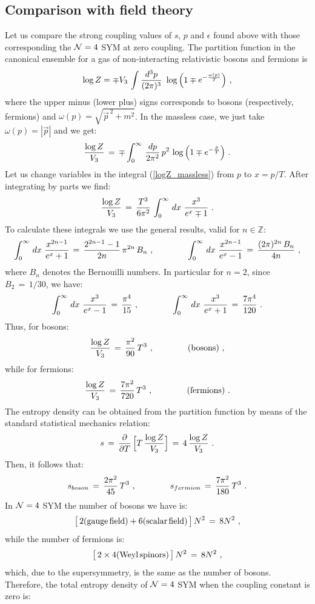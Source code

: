 \documentclass[12pt,notitlepage]{article}
\newcommand{\beq}{\begin{equation}}
\newcommand{\eeq}{\end{equation}}
\begin{document}
\subsection{ Comparison with field theory}
Let us compare the strong coupling values of  $s$, $p$ and $\epsilon$  found above with those corresponding the ${\cal N}=4$ SYM at zero coupling.  The partition function in the canonical ensemble for  a gas of  non-interacting relativistic bosons and fermions is 
\beq
\log Z=\mp V_3\,\int {d^3p\over (2\pi)^3}\,\,\log \Big(
1\mp e^{-{\omega(p)\over T}}\Big)\,\,,
\eeq
where  the upper minus (lower plus) signs corresponds to bosons (respectively, fermions) and $\omega(p)=\sqrt{\vec p^{\,2}+m^2}$. In the massless case, we just take $\omega(p)=|\vec p|$ and we get:
\beq
{\log Z\over V_3}\,=\,\mp \int_0^{\infty}\,{dp\over 2\pi^2}\,p^2\,\log\Big(1\mp e^{-{p\over T}}\Big)\,\,.
\label{logZ_massless}
\eeq
Let us change variables in the integral (\ref{logZ_massless}) from $p$ to $x=p/T$. After integrating by parts we find:
\beq
{\log Z\over V_3}\,=\,{T^3\over 6\pi^2}\,\int_{0}^{\infty}\,dx\,\,
{x^3\over e^x\mp 1}\,\,.
\eeq
To calculate these integrals we use the general results, valid for $n\in {\mathbb Z}$:
\beq
\int_{0}^{\infty}\,dx\,\,{x^{2n-1}\over e^x+1}\,=\,{2^{2n-1}-1\over 2n}\,\pi^{2n}\,B_n
\,\,,
\qquad\qquad
\int_{0}^{\infty}\,dx\,\,{x^{2n-1}\over e^x-1}\,=\,{(2\pi)^{2n}\,B_n\over 4n}\,\,,
\eeq
where $B_n$ denotes the Bernouilli numbers. In particular for $n=2$, since 
$B_2\,=\,1/ 30$, we have:
\beq
\int_{0}^{\infty}\,dx\,\,{x^{3}\over e^x-1}\,=\,{\pi^4\over 15}
\,\,,
\qquad\qquad
\int_{0}^{\infty}\,dx\,\,{x^{3}\over e^x+1}\,=\,{7\pi^4\over 120}\,\,.
\eeq
Thus, for bosons:
\beq
{\log Z\over V_3}\,=\,{\pi^2\over 90}\,T^3\,\,,
\qquad\qquad
({\rm bosons})\,\,,
\eeq
while for fermions:
\beq
{\log Z\over V_3}\,=\,{7\pi^2\over 720}\,T^3\,\,,
\qquad\qquad
({\rm fermions})\,\,.
\eeq
The entropy density can be obtained from the partition function by means of the standard 
statistical mechanics relation:
\beq
s\,=\,{\partial \over \partial T}\,\Big[T\,{\log Z\over V_3}\Big]\,=\,4\,{\log Z\over V_3}\,\,.
\eeq
Then, it follows that:
\beq
s_{boson}\,=\,{2\pi^2\over 45}\,T^3
\,\,,
\qquad\qquad
s_{fermion}\,=\,{7\pi^2\over 180}\,T^3\,\,.
\eeq
In ${\cal N}=4$ SYM the number of bosons we have is:
\beq
\big[\,2({\rm gauge \,field})+6 ({\rm scalar \,field})\,\big]\,N^2\,=\,8N^2\,\,,
\eeq
while the number of fermions is:
\beq
\big[\,2\times 4({\rm Weyl\,spinors})\,\big]\,N^2\,=\,8N^2\,\,,
\eeq
which, due to the supersymmetry, is the same as the number of bosons. Therefore, the total entropy  density  of  ${\cal N}=4$ SYM  when the coupling constant is zero is:
\end{document}
